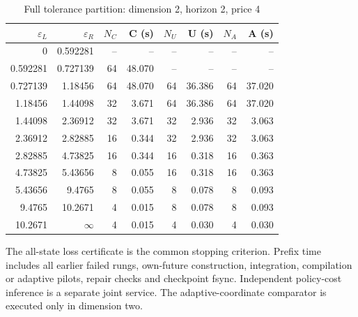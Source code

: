 \begin{table}[htbp]
\centering
\caption{Full tolerance partition: dimension 2, horizon 2, price 4}\label{tab:frontier-full48-2-2-4}
\footnotesize
\begin{tabular}{rrrrrrrr}
\toprule
$\varepsilon_L$ & $\varepsilon_R$ & $N_C$ & C (s) & $N_U$ & U (s) & $N_A$ & A (s)\\
\midrule
0 & 0.592281 & -- & -- & -- & -- & -- & -- \\
0.592281 & 0.727139 & 64 & 48.070 & -- & -- & -- & -- \\
0.727139 & 1.18456 & 64 & 48.070 & 64 & 36.386 & 64 & 37.020 \\
1.18456 & 1.44098 & 32 & 3.671 & 64 & 36.386 & 64 & 37.020 \\
1.44098 & 2.36912 & 32 & 3.671 & 32 & 2.936 & 32 & 3.063 \\
2.36912 & 2.82885 & 16 & 0.344 & 32 & 2.936 & 32 & 3.063 \\
2.82885 & 4.73825 & 16 & 0.344 & 16 & 0.318 & 16 & 0.363 \\
4.73825 & 5.43656 & 8 & 0.055 & 16 & 0.318 & 16 & 0.363 \\
5.43656 & 9.4765 & 8 & 0.055 & 8 & 0.078 & 8 & 0.093 \\
9.4765 & 10.2671 & 4 & 0.015 & 8 & 0.078 & 8 & 0.093 \\
10.2671 & $\infty$ & 4 & 0.015 & 4 & 0.030 & 4 & 0.030 \\
\bottomrule
\end{tabular}
\begin{minipage}{0.97\linewidth}\footnotesize\vspace{3pt}
The all-state loss certificate is the common stopping criterion. Prefix time includes all earlier failed rungs, own-future construction, integration, compilation or adaptive pilots, repair checks and checkpoint fsync. Independent policy-cost inference is a separate joint service. The adaptive-coordinate comparator is executed only in dimension two.
\end{minipage}
\end{table}
